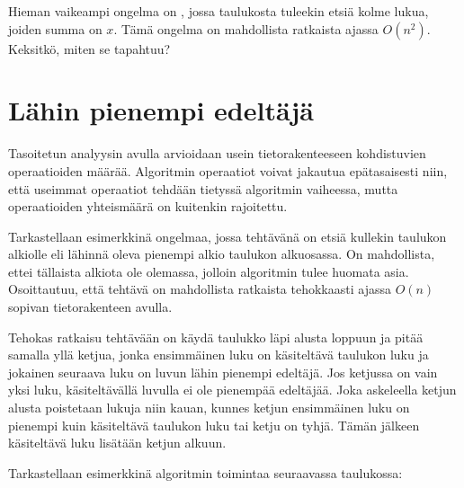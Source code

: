 Hieman vaikeampi ongelma on ,
jossa taulukosta tuleekin etsiä kolme lukua,
joiden summa on $x$.
Tämä ongelma on mahdollista ratkaista ajassa $O(n^2)$.
Keksitkö, miten se tapahtuu?

\section{Lähin pienempi edeltäjä}


Tasoitetun analyysin avulla arvioidaan usein
tietorakenteeseen kohdistuvien operaatioiden määrää.
Algoritmin operaatiot voivat jakautua epätasaisesti
niin, että useimmat operaatiot tehdään tietyssä
algoritmin vaiheessa, mutta operaatioiden
yhteismäärä on kuitenkin rajoitettu.

Tarkastellaan esimerkkinä ongelmaa,
jossa tehtävänä on etsiä kullekin taulukon
alkiolle
 eli
lähinnä oleva pienempi alkio taulukon alkuosassa.
On mahdollista, ettei tällaista alkiota ole olemassa,
jolloin algoritmin tulee huomata asia.
Osoittautuu, että tehtävä on mahdollista ratkaista
tehokkaasti ajassa $O(n)$ sopivan tietorakenteen avulla.

Tehokas ratkaisu tehtävään on käydä
taulukko läpi alusta loppuun ja pitää samalla yllä ketjua,
jonka ensimmäinen luku on käsiteltävä taulukon luku
ja jokainen seuraava luku on luvun lähin
pienempi edeltäjä.
Jos ketjussa on vain yksi luku,
käsiteltävällä luvulla ei ole pienempää edeltäjää.
Joka askeleella ketjun alusta poistetaan lukuja
niin kauan, kunnes ketjun ensimmäinen luku on 
pienempi kuin käsiteltävä taulukon luku tai ketju on tyhjä.
Tämän jälkeen käsiteltävä luku lisätään ketjun alkuun.

Tarkastellaan esimerkkinä algoritmin toimintaa
seuraavassa taulukossa:
\begin{center}
\end{center}

